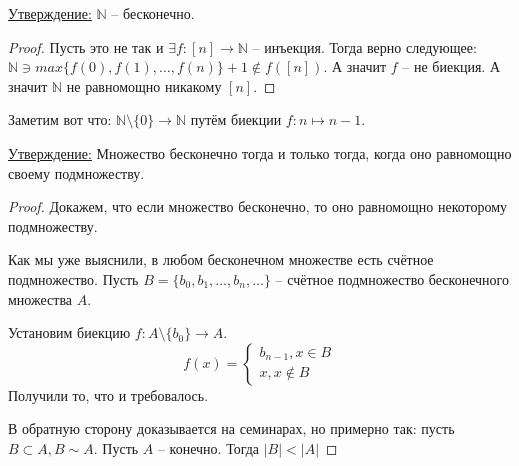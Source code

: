 \documentclass[a4paper, 12pt]{article}
\newcommand{\statement}{\underline{Утверждение:} }
\newcommand{\N}{\mathbb{N}}
\begin{document}
\statement $\N$ -- бесконечно.
\begin{proof}
    Пусть это не так и $\exists f: [n] \to \N$ -- инъекция. Тогда верно следующее:
    $\N \ni max\{f(0), f(1), \ldots, f(n)\}+1 \notin f([n])$. А значит $f$ -- не биекция.
    А значит $\N$ не равномощно никакому $[n]$.
\end{proof}
    
Заметим вот что: $\N \setminus \{0\} \to \N$ путём биекции $f: n \mapsto n-1$.

\statement Множество бесконечно тогда и только тогда, когда оно равномощно 
своему подмножеству.
\begin{proof}
    Докажем, что если множество бесконечно, то оно равномощно некоторому подмножеству.

    Как мы уже выяснили, в любом бесконечном множестве есть счётное подмножество.
    Пусть $B = \{b_0, b_1, \ldots, b_n, \ldots\}$ -- счётное подмножество
    бесконечного множества $A$.

    Установим биекцию $f: A \setminus \{b_0\} \to A$.
    \[
    f(x) = \begin{cases}
        b_{n-1}, x \in B \\
        x, x \notin B
    \end{cases}
    \]
    Получили то, что и требовалось.

    В обратную сторону доказывается на семинарах, но примерно так:
    пусть $B \subset A, B \sim A$. Пусть $A$ -- конечно. Тогда $|B| < |A|$
\end{proof}
\end{document}
